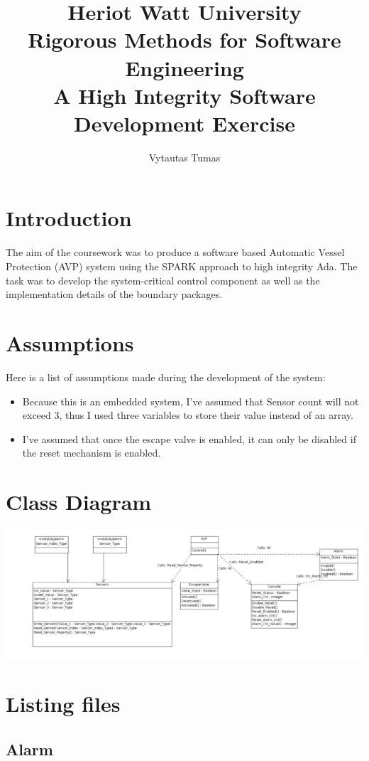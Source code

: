 \documentclass[a4paper, titlepage]{article}
\begin{document}
\title{
Heriot Watt University \protect\\ Rigorous Methods for Software Engineering\protect\\A High Integrity Software Development Exercise
}

\author{Vytautas Tumas}

\maketitle
\tableofcontents
\section{Introduction}
The aim of the coursework was to produce a software based Automatic Vessel Protection (AVP) system using the SPARK approach to high integrity Ada. The task was to develop the system-critical control component as well as the implementation details of the boundary packages.
\section{Assumptions}
Here is a list of assumptions made during the development of the system:
\begin{itemize}
\item Because this is an embedded system, I've assumed that Sensor count will not exceed 3, thus I used three variables to store their value instead of an array.
\item I've assumed that once the escape valve is enabled, it can only be disabled if the reset mechanism is enabled.
\end{itemize}
\section{Class Diagram}
\includegraphics[scale=0.5]{diagram}
\section{Listing files}
\subsection{Alarm}
\end{document}
